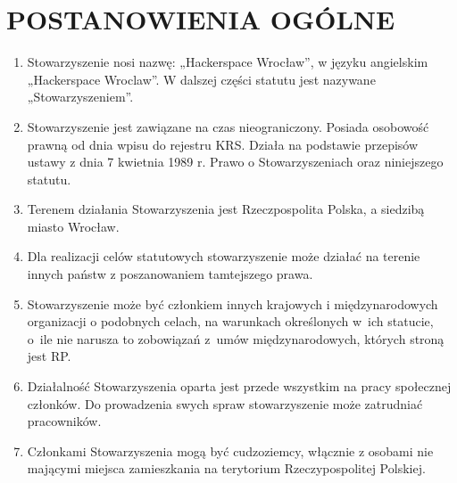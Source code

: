 \documentclass{article}
\begin{document}
\section{POSTANOWIENIA OGÓLNE}
  \begin{enumerate}
    \item Stowarzyszenie nosi nazwę: „Hackerspace Wrocław”, w języku angielskim „Hackerspace Wroclaw”. W dalszej części statutu jest nazywane „Stowarzyszeniem”.
    \item Stowarzyszenie jest zawiązane na czas nieograniczony. Posiada osobowość prawną od dnia wpisu do rejestru KRS. Działa na podstawie przepisów ustawy z dnia 7 kwietnia 1989 r. Prawo o Stowarzyszeniach oraz niniejszego statutu.
    \item Terenem działania Stowarzyszenia jest Rzeczpospolita Polska, a siedzibą miasto Wrocław.
    \item Dla realizacji celów statutowych stowarzyszenie może działać na terenie innych państw z poszanowaniem tamtejszego prawa.
    \item Stowarzyszenie może być członkiem innych krajowych i międzynarodowych organizacji o podobnych celach, na warunkach określonych w~ich statucie, o~ile nie narusza to zobowiązań z~umów międzynarodowych, których stroną jest RP. 
    \item Działalność Stowarzyszenia oparta jest przede wszystkim na pracy społecznej członków. Do prowadzenia swych spraw stowarzyszenie może zatrudniać pracowników.
    \item Członkami Stowarzyszenia mogą być cudzoziemcy, włącznie z osobami nie mającymi miejsca zamieszkania na terytorium Rzeczypospolitej Polskiej.
  \end{enumerate}
\end{document}
